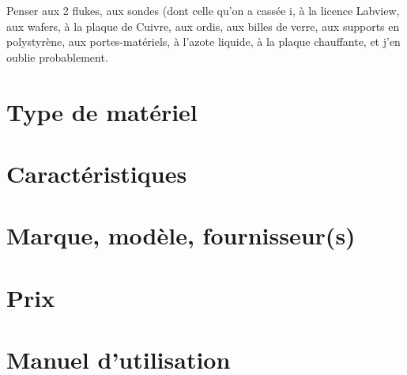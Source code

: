 Penser aux 2 flukes, aux sondes (dont celle qu'on a cassée ^^),
à la licence Labview, aux wafers, à la plaque de Cuivre, aux ordis, 
aux billes de verre, aux supports en polystyrène, aux portes-matériels, 
à l'azote liquide, à la plaque chauffante, et j'en oublie probablement.

\section*{Type de matériel}
\section*{Caractéristiques}
\section*{Marque, modèle, fournisseur(s)}
\section*{Prix}
\section*{Manuel d'utilisation}

